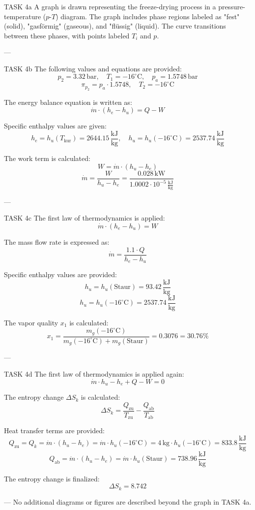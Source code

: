 TASK 4a  
A graph is drawn representing the freeze-drying process in a pressure-temperature (\( p \)-\( T \)) diagram. The graph includes phase regions labeled as "fest" (solid), "gasförmig" (gaseous), and "flüssig" (liquid). The curve transitions between these phases, with points labeled \( T_i \) and \( p \).  

---

TASK 4b  
The following values and equations are provided:  
\[
p_2 = 3.32 \, \text{bar}, \quad T_1 = -16^\circ\text{C}, \quad p_a = 1.5748 \, \text{bar}
\]  
\[
\pi_{p_2} = p_a \cdot 1.5748, \quad T_2 = -16^\circ\text{C}
\]  

The energy balance equation is written as:  
\[
\dot{m} \cdot (h_e - h_u) = Q - W
\]  

Specific enthalpy values are given:  
\[
h_e = h_u(T_{\text{kur}}) = 2644.15 \, \frac{\text{kJ}}{\text{kg}}, \quad h_u = h_u(-16^\circ\text{C}) = 2537.74 \, \frac{\text{kJ}}{\text{kg}}
\]  

The work term is calculated:  
\[
W = \dot{m} \cdot (h_u - h_e)
\]  
\[
\dot{m} = \frac{W}{h_u - h_e} = \frac{0.028 \, \text{kW}}{1.0002 \cdot 10^{-5} \, \frac{\text{kJ}}{\text{kg}}}
\]  

---

TASK 4c  
The first law of thermodynamics is applied:  
\[
\dot{m} \cdot (h_e - h_u) = W
\]  

The mass flow rate is expressed as:  
\[
\dot{m} = \frac{1.1 \cdot Q}{h_e - h_u}
\]  

Specific enthalpy values are provided:  
\[
h_u = h_u(\text{Staur}) = 93.42 \, \frac{\text{kJ}}{\text{kg}}
\]  
\[
h_u = h_u(-16^\circ\text{C}) = 2537.74 \, \frac{\text{kJ}}{\text{kg}}
\]  

The vapor quality \( x_1 \) is calculated:  
\[
x_1 = \frac{m_g(-16^\circ\text{C})}{m_g(-16^\circ\text{C}) + m_g(\text{Staur})} = 0.3076 = 30.76\%
\]  

---

TASK 4d  
The first law of thermodynamics is applied again:  
\[
\dot{m} \cdot h_u - h_e + Q - W = 0
\]  

The entropy change \( \Delta S_k \) is calculated:  
\[
\Delta S_k = \frac{Q_{\text{zu}}}{T_{\text{zu}}} - \frac{Q_{\text{ab}}}{T_{\text{ab}}}
\]  

Heat transfer terms are provided:  
\[
Q_{\text{zu}} = Q_k = \dot{m} \cdot (h_u - h_e) = \dot{m} \cdot h_u(-16^\circ\text{C}) = 4 \, \text{kg} \cdot h_u(-16^\circ\text{C}) = 833.8 \, \frac{\text{kJ}}{\text{kg}}
\]  
\[
Q_{\text{ab}} = \dot{m} \cdot (h_u - h_e) = \dot{m} \cdot h_u(\text{Staur}) = 738.96 \, \frac{\text{kJ}}{\text{kg}}
\]  

The entropy change is finalized:  
\[
\Delta S_k = 8.742
\]  

---  
No additional diagrams or figures are described beyond the graph in TASK 4a.